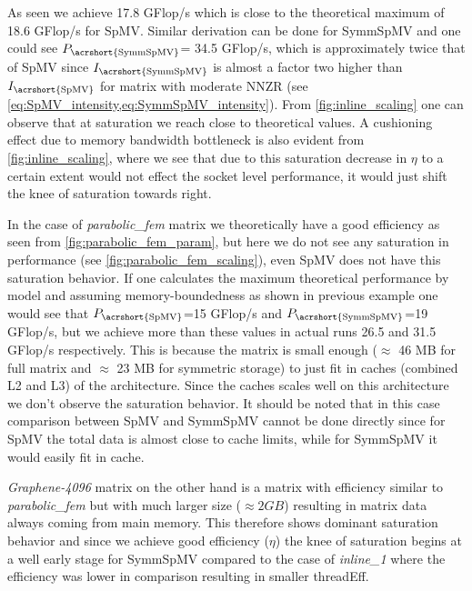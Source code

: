 As seen we achieve 17.8 GFlop/s which is close to the theoretical maximum of 18.6 GFlop/s for \acrshort{SpMV}. Similar derivation can be done for \acrshort{SymmSpMV} and one could see $P_\mathrm{\acrshort{SymmSpMV}}$= 34.5 GFlop/s, which is approximately twice that of \acrshort{SpMV} since $I_\mathrm{\acrshort{SymmSpMV}}$ is almost a factor two higher than $I_\mathrm{\acrshort{SpMV}}$ for matrix with moderate \acrshort{NNZR} (see \cref{eq:SpMV_intensity,eq:SymmSpMV_intensity}). From \cref{fig:inline_scaling} one can observe that at saturation we reach close to theoretical values. A cushioning effect due to memory bandwidth bottleneck is also evident from \cref{fig:inline_scaling}, where we see that due to this saturation decrease in $\eta$ to a certain extent would not effect the socket level performance, it would just shift the knee of saturation towards right.

In the case of \emph{parabolic\_fem} matrix we theoretically have a good efficiency as seen from \cref{fig:parabolic_fem_param}, but here we do not see any saturation in performance (see \cref{fig:parabolic_fem_scaling}), even \acrshort{SpMV} does not have this saturation behavior. If one calculates the maximum  theoretical performance by \roofline model and assuming memory-boundedness as shown in previous example one would see that $P_\mathrm{\acrshort{SpMV}}$=15 GFlop/s and $P_\mathrm{\acrshort{SymmSpMV}}$=19 GFlop/s, but we achieve more than these values in actual runs 26.5 and 31.5 GFlop/s respectively. This is because the matrix is small enough ($\approx$ 46 MB for full matrix and $\approx$ 23 MB for symmetric storage) to just fit in caches (combined L2 and L3) of the \SKX architecture. Since the caches scales well on this architecture we don't observe the saturation behavior. It should be noted that in this case comparison between \acrshort{SpMV} and \acrshort{SymmSpMV} cannot be done directly since for \acrshort{SpMV} the total data is almost close to cache limits, while for \acrshort{SymmSpMV} it would easily fit in cache.

\emph{Graphene-4096} matrix on the other hand is a matrix with efficiency similar to \emph{parabolic\_fem} but with much larger size ($\approx 2 GB$) resulting in matrix data always coming from main memory. This therefore shows dominant saturation behavior and since we achieve good efficiency ($\eta$) the knee of saturation begins at a well early stage for \acrshort{SymmSpMV} compared to  the case of \emph{inline\_1} where the efficiency was lower in comparison resulting in smaller \acrshort{threadEff}.



